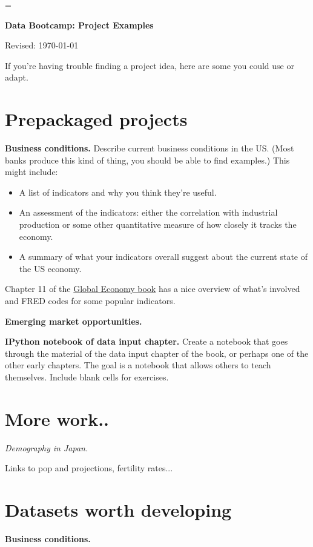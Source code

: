 \documentclass[11pt]{article}
\begin{document}
\parskip=\bigskipamount
\parindent=0.0in
\thispagestyle{empty}


\bigskip\bigskip
\centerline{\Large \bf Data Bootcamp:  Project Examples}
\centerline{Revised: \today}

\medskip
If you're having trouble finding a project idea, here are some you could use or adapt.

\section{Prepackaged projects}

{\bf Business conditions.\/}  Describe current business conditions in the US.  
(Most banks produce this kind of thing, you should be able to find examples.)  
This might include:  
\begin{itemize}
\item A list of indicators and why you think they're useful.  
\item An assessment of the indicators:  either the correlation with industrial production 
or some other quantitative measure of how closely it tracks the economy. 
\item A summary of what your indicators overall suggest about the current state 
of the US economy.  
\end{itemize} 
Chapter 11 of the \href{(http://www.stern.nyu.edu/experience-stern/about/departments-centers-initiatives/centers-of-research/global-economy-business/development-initiatives/global-economy-course}
{Global Economy book} has a nice overview of what's involved
and FRED codes for some popular indicators.

{\bf Emerging market opportunities.\/}  


{\bf IPython notebook of data input chapter.\/}
Create a notebook that goes through the material of the data input chapter of the book, 
or perhaps one of the other early chapters.  
The goal is a notebook that allows others to teach themselves.  
Include blank cells for exercises.  




\section{More work..}

{\it Demography in Japan.\/}

Links to pop and projections, fertility rates...


\section*{Datasets worth developing}



{\bf Business conditions.\/}



\end{document}
